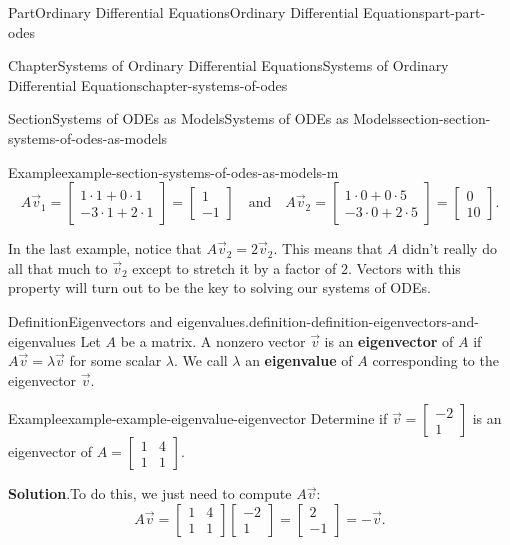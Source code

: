 \documentclass[twoside,10pt,]{book}
\newcommand{\blocktitlefont}{\relax}
\newcommand{\terminology}[1]{\textbf{#1}}
\numberwithin{equation}{part}
\begin{document}
\begin{partptx}{Part}{Ordinary Differential Equations}{}{Ordinary Differential Equations}{}{}{part-part-odes}
\begin{chapterptx}{Chapter}{Systems of Ordinary Differential Equations}{}{Systems of Ordinary Differential Equations}{}{}{chapter-systems-of-odes}
\begin{sectionptx}{Section}{Systems of ODEs as Models}{}{Systems of ODEs as Models}{}{}{section-section-systems-of-odes-as-models}
\begin{example}{Example}{}{example-section-systems-of-odes-as-models-m}
\begin{equation*}
A\vec{v}_{1} = \begin{bmatrix}1\cdot1+0\cdot1\\-3\cdot1+2\cdot1\end{bmatrix} = \begin{bmatrix}1\\-1\end{bmatrix}\quad\text{and}\quad A\vec{v}_{2} = \begin{bmatrix}1\cdot0+0\cdot5\\-3\cdot0+2\cdot5\end{bmatrix} = \begin{bmatrix}0\\10\end{bmatrix}.
\end{equation*}
%
\end{example}
In the last example, notice that \(A\vec{v}_{2} = 2\vec{v}_{2}\). This means that \(A\) didn't really do all that much to \(\vec{v}_{2}\) except to stretch it by a factor of \(2\). Vectors with this property will turn out to be the key to solving our systems of ODEs.%
\begin{definition}{Definition}{Eigenvectors and eigenvalues.}{definition-definition-eigenvectors-and-eigenvalues}%
Let \(A\) be a matrix. A nonzero vector \(\vec{v}\) is an \terminology{eigenvector} of \(A\) if \(A\vec{v} = \lambda\vec{v}\) for some scalar \(\lambda\). We call \(\lambda\) an \terminology{eigenvalue} of \(A\) corresponding to the eigenvector \(\vec{v}\).%
\end{definition}
\begin{example}{Example}{}{example-example-eigenvalue-eigenvector}%
Determine if \(\vec{v} = \begin{bmatrix}-2\\1\end{bmatrix}\) is an eigenvector of \(A = \begin{bmatrix}1&4\\1&1\end{bmatrix}\).%
\par\smallskip%
\noindent\textbf{\blocktitlefont Solution}.\hypertarget{solution-example-eigenvalue-eigenvector-b}{}\quad{}To do this, we just need to compute \(A\vec{v}:\)%
\begin{equation*}
A\vec{v} = \begin{bmatrix}1&4\\1&1\end{bmatrix}\begin{bmatrix}-2\\1\end{bmatrix} = \begin{bmatrix}2\\-1\end{bmatrix} = -\vec{v}.

\end{equation*}
\end{example}
\end{sectionptx}
\end{chapterptx}
\end{partptx}
\end{document}
